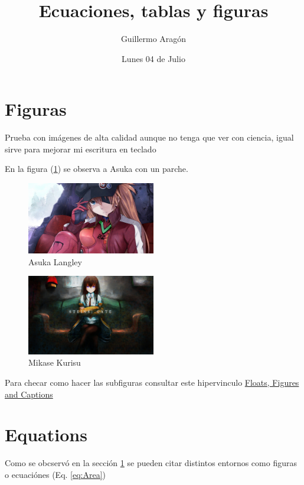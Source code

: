 \documentclass[twocolumn]{article}
\title{\sc Ecuaciones, tablas y figuras}
\author{Guillermo Arag\'on}
\date{Lunes 04 de Julio}
\begin{document}
\thispagestyle{empty}
\maketitle	

\section{Figuras} %
\label{sec:figuras}

Prueba con im\'agenes de alta calidad aunque no tenga que ver con ciencia, igual sirve para mejorar mi escritura en teclado
	

\blindtext



\vspace{1cm}
En la figura (\ref{fig:Asuka Parche}) \hspace{1cm} se observa a Asuka con un parche.

\begin{figure}[h!]
	\centering
	\includegraphics[width=0.5\textwidth]{911}
	\caption{Asuka Langley}
	\label{fig:Asuka Parche}
\end{figure}

\begin{figure}[h!]
	\centering
	\includegraphics[width=0.5\textwidth]{mk}
	\caption{Mikase Kurisu}
	\label{fig:Mikase Kurisu}
\end{figure}

Para checar como hacer las subfiguras consultar este hipervinculo \href{https://en.wikibooks.org/wiki/LaTeX/Floats,_Figures_and_Captions}{Floats, Figures and Captions}

\section{Equations} %
\label{sec:equatinons}
Como se obcserv\'o en la secci\'on \ref{sec:figuras} se pueden citar distintos entornos  como figuras o ecuaci\'ones (Eq. \eqref{eq:Area})
\end{document}
